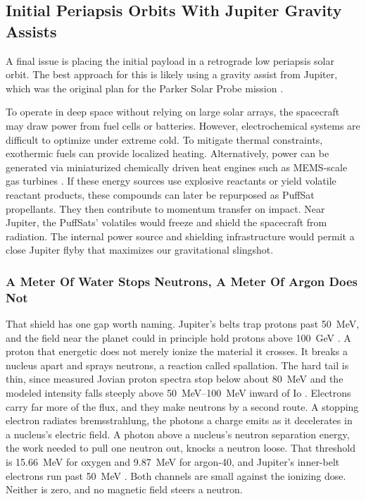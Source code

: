 \documentclass{article}
\begin{document}
\subsection{Initial Periapsis Orbits With Jupiter Gravity Assists} \label{sec:jupiter_gravity_initial}
A final issue is placing the initial payload in a retrograde low periapsis solar orbit.  The best approach for this is likely using a gravity assist from Jupiter, which was the original plan for the Parker Solar Probe mission \cite{mccomas2005solar}. 

To operate in deep space without relying on large solar arrays, the spacecraft may draw power from fuel cells or batteries. However, electrochemical systems are difficult to optimize under extreme cold. To mitigate thermal constraints, exothermic fuels can provide localized heating.  Alternatively, power can be generated via miniaturized chemically driven heat engines such as MEMS-scale gas turbines \cite{mems_gas_turbine}. If these energy sources use explosive reactants or yield volatile reactant products, these compounds can later be repurposed as PuffSat propellants. They then contribute to momentum transfer on impact. Near Jupiter, the PuffSats' volatiles would freeze and shield the spacecraft from radiation. The internal power source and shielding infrastructure would permit a close Jupiter flyby that maximizes our gravitational slingshot.

\subsubsection{A Meter Of Water Stops Neutrons, A Meter Of Argon Does Not}\label{sec:jovian_neutron_shield}
That shield has one gap worth naming. Jupiter's belts trap protons past \SI{50}{\mega\electronvolt}, and the field near the planet could in principle hold protons above \SI{100}{\giga\electronvolt} \cite{roussos2021jovian_belts}. A proton that energetic does not merely ionize the material it crosses. It breaks a nucleus apart and sprays neutrons, a reaction called spallation. The hard tail is thin, since measured Jovian proton spectra stop below about \SI{80}{\mega\electronvolt} and the modeled intensity falls steeply above \SIrange[range-phrase={--},range-units=single]{50}{100}{\mega\electronvolt} inward of Io \cite{nenon2018jovian_protons, roussos2021jovian_belts}. Electrons carry far more of the flux, and they make neutrons by a second route. A stopping electron radiates bremsstrahlung, the photons a charge emits as it decelerates in a nucleus's electric field. A photon above a nucleus's neutron separation energy, the work needed to pull one neutron out, knocks a neutron loose. That threshold is \SI{15.66}{\mega\electronvolt} for oxygen and \SI{9.87}{\mega\electronvolt} for argon-40, and Jupiter's inner-belt electrons run past \SI{50}{\mega\electronvolt} \cite{roussos2021jovian_belts}. Both channels are small against the ionizing dose. Neither is zero, and no magnetic field steers a neutron.
\end{document}
